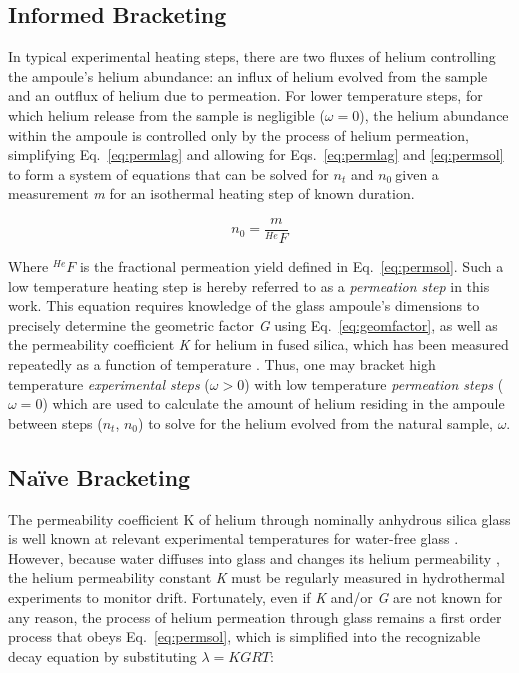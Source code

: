 \subsection{Informed Bracketing}\label{informed-bracketing}

In typical experimental heating steps, there are two fluxes of helium controlling the ampoule's helium abundance: an influx of helium evolved from the sample and an outflux of helium due to permeation. For lower temperature steps, for which helium release from the sample is negligible (\(\omega = 0\)), the helium abundance within the ampoule is controlled only by the process of helium permeation, simplifying Eq.~\eqref{eq:permlag} and allowing for Eqs.~\eqref{eq:permlag} and \eqref{eq:permsol} to form a system of equations that can be solved for \(n_{t}\) and \(n_{0}\ \)given a measurement \emph{m} for an isothermal heating step of known duration.

\begin{equation}
\label{eq:n0informed}
n_{0} = \frac{m}{^{He}F}
\end{equation}

Where \(^{He}F\) is the fractional permeation yield defined in Eq.~\eqref{eq:permsol}. Such a low temperature heating step is hereby referred to as a \emph{permeation step} in this work. This equation requires knowledge of the glass ampoule's dimensions to precisely determine the geometric factor \emph{G} using Eq.~\eqref{eq:geomfactor}, as well as the permeability coefficient \emph{K} for helium in fused silica, which has been measured repeatedly as a function of temperature \citep{norton1953,altemose1961,swets1961,masaryk1968}. Thus, one may bracket high temperature \emph{experimental steps} (\(\omega > 0\)) with low temperature \emph{permeation steps} (\(\omega = 0\)) which are used to calculate the amount of helium residing in the ampoule between steps (\(n_{t}\), \(n_{0}\)) to solve for the helium evolved from the natural sample, \(\omega\).

\subsection{Naïve Bracketing}\label{naive-bracketing}

The permeability coefficient K of helium through nominally anhydrous silica glass is well known at relevant experimental temperatures for water-free glass \citep{norton1953,altemose1961,swets1961,rogers1954,masaryk1968}. However, because water diffuses into glass and changes its helium permeability \citep{shelby1972,tsuru2011}, the helium permeability constant \emph{K} must be regularly measured in hydrothermal experiments to monitor drift. Fortunately, even if \emph{K} and/or \emph{G} are not known for any reason, the process of helium permeation through glass remains a first order process that obeys Eq.~\eqref{eq:permsol}, which is simplified into the recognizable decay equation by substituting \(\lambda = KGRT\):

